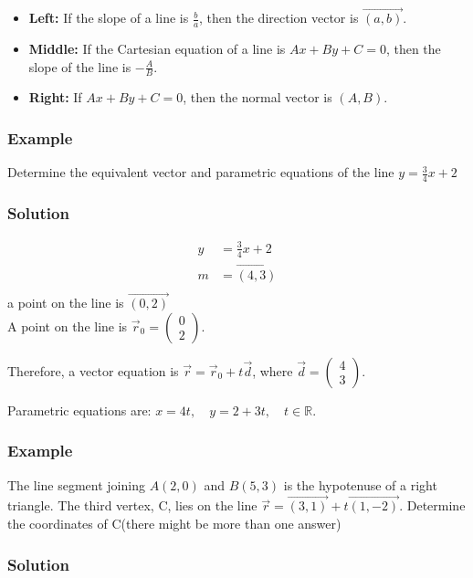 \documentclass{article}
\begin{document}
\begin{itemize}
    \item \textbf{Left:} If the slope of a line is $\frac{b}{a}$, then the direction vector is $\overrightarrow{(a,b)}$.
    \item \textbf{Middle:} If the Cartesian equation of a line is $Ax + By + C = 0$, then the slope of the line is $-\frac{A}{B}$.
    \item \textbf{Right:} If $Ax + By + C = 0$, then the normal vector is $(A,B)$.
\end{itemize}
\subsubsection*{Example}
Determine the equivalent vector and parametric equations of the line $y=\frac{3}{4}x+2$
\subsubsection*{Solution}
\begin{align*}
    y&=\frac{3}{4}x+2\\
    m&=\overrightarrow{(4,3)}\\
\end{align*}
a point on the line is $\overrightarrow{(0,2)}$\\
A point on the line is $\vec{r}_0 = \begin{pmatrix} 0 \\ 2 \end{pmatrix}$.

Therefore, a vector equation is $\vec{r} = \vec{r}_0 + t \vec{d}$, where $\vec{d} = \begin{pmatrix} 4 \\ 3 \end{pmatrix}$.

Parametric equations are:
$ x = 4t, \quad y = 2 + 3t, \quad t \in \mathbb{R}.$
\subsubsection*{Example }
The line segment joining $A(2,0)$ and $B(5,3)$ is the hypotenuse of a right triangle. The third vertex, C, lies on the line $\vec{r}=\overrightarrow{(3,1)}+t\overrightarrow{(1,-2)}$. Determine the coordinates of C(there might be more than one answer)

\subsubsection*{Solution}
\end{document}

